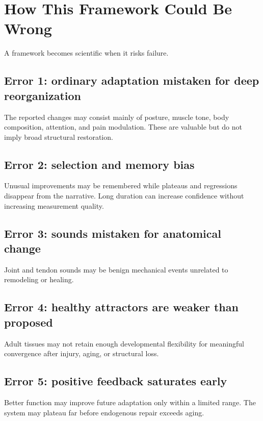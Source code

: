 \chapter{How This Framework Could Be Wrong}

A framework becomes scientific when it risks failure.

\section{Error 1: ordinary adaptation mistaken for deep reorganization}

The reported changes may consist mainly of posture, muscle tone, body composition, attention, and pain modulation. These are valuable but do not imply broad structural restoration.

\section{Error 2: selection and memory bias}

Unusual improvements may be remembered while plateaus and regressions disappear from the narrative. Long duration can increase confidence without increasing measurement quality.

\section{Error 3: sounds mistaken for anatomical change}

Joint and tendon sounds may be benign mechanical events unrelated to remodeling or healing.

\section{Error 4: healthy attractors are weaker than proposed}

Adult tissues may not retain enough developmental flexibility for meaningful convergence after injury, aging, or structural loss.

\section{Error 5: positive feedback saturates early}

Better function may improve future adaptation only within a limited range. The system may plateau far before endogenous repair exceeds aging.

